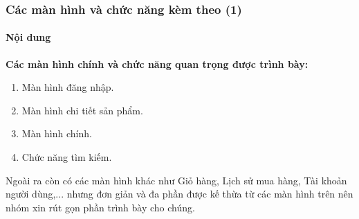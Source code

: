 \documentclass{beamer}
\begin{document}
\begin{frame}
    \frametitle{Các màn hình và chức năng kèm theo (1)}
    \framesubtitle{Nội dung}
    \begin{flushleft}
        \large{\textbf{Các màn hình chính và chức năng quan trọng được trình bày:}}
        \begin{enumerate}
            \item Màn hình đăng nhập.
            \item Màn hình chi tiết sản phẩm.
            \item Màn hình chính.
            \item Chức năng tìm kiếm.
        \end{enumerate}
    \end{flushleft}

    \begin{flushleft}
        \begin{block}{}
            Ngoài ra còn có các màn hình khác như \textsf{\color{teal} Giỏ hàng, Lịch sử mua hàng, Tài khoản người dùng,...} nhưng đơn giản và đa phần được kế thừa từ các màn hình trên nên nhóm xin rút gọn phần trình bày cho chúng.
        \end{block}
    \end{flushleft}
\end{frame}
\end{document}
